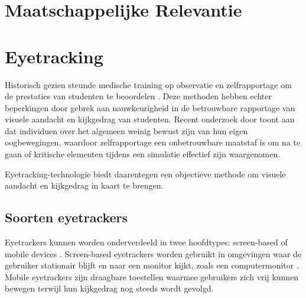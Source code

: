 \section{Maatschappelijke Relevantie}


\section{Eyetracking}

Historisch gezien steunde medische training op observatie en zelfrapportage om de prestaties van studenten te beoordelen \autocite{PAUSZEK2023100031}. 
Deze methoden hebben echter beperkingen door gebrek aan nauwkeurigheid in de betrouwbare rapportage van visuele aandacht en kijkgedrag van studenten.
Recent onderzoek door \textcite{Alasdair2017} toont aan dat individuen over het algemeen weinig bewust zijn van hun eigen oogbewegingen, 
waardoor zelfrapportage een onbetrouwbare maatstaf is om na te gaan of kritische elementen tijdens een simulatie effectief zijn waargenomen.

Eyetracking-technologie biedt daarentegen een objectieve methode om visuele aandacht en kijkgedrag in kaart te brengen. 

\subsection{Soorten eyetrackers}

Eyetrackers kunnen worden onderverdeeld in twee hoofdtypes: screen-based of mobile devices \autocite{PAUSZEK2023100031}.
Screen-based eyetrackers worden gebruikt in omgevingen waar de gebruiker stationair blijft en naar een monitor kijkt, zoals een computermonitor .
Mobile eyetrackers zijn draagbare toestellen waarmee gebruikers zich vrij kunnen bewegen terwijl hun kijkgedrag nog steeds wordt gevolgd.

